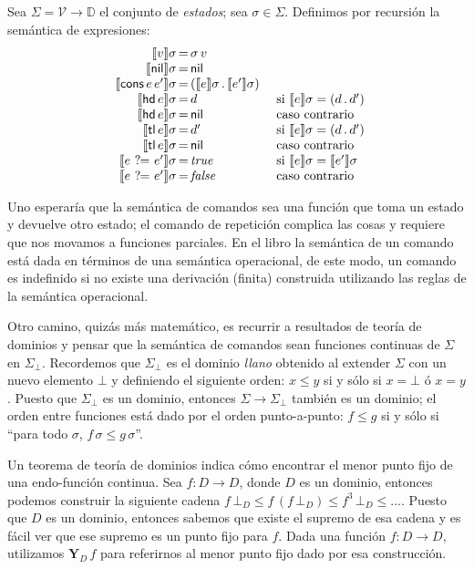 \documentclass[a4paper,twoside,12pt]{article}
\newcommand{\trees}{\mathbb{D}}
\newcommand{\nil}{\mathsf{nil}}
\newcommand{\cons}[2]{(#1\, .\, #2)}
\newcommand{\falseD}{\mathit{false}}
\newcommand{\trueD}{\mathit{true}}
\newcommand{\vars}{\mathcal{V}}
\newcommand{\hd}{\mathsf{hd}}
\newcommand{\tl}{\mathsf{tl}}
\newcommand{\conse}{\mathsf{cons}}
\newcommand{\isEq}{\mathop{?\!\!=}}
\newcommand{\sem}[2]{\llbracket #1 \rrbracket #2}
\newcommand{\fixpoint}[2]{\mathbf{Y}_{#1}\,#2}
\begin{document}
\begin{definition}[Semántica]
  Sea $\Sigma = \vars \to \trees$ el conjunto de \emph{estados}; sea
  $\sigma \in \Sigma$. Definimos por recursión la semántica de
  expresiones:
  \[
  \array{r@{\,=\,}l@{\quad}l@{}}%
  \sem{v}{\sigma} & \sigma\,v & {} \\
  \sem{\nil}{\sigma} & \nil & {} \\
  \sem{\conse\,e\,e'}{\sigma} & \cons{\sem e \sigma}{\sem{e'}{\sigma}} & {} \\
  \sem{\hd\,e}{\sigma} & d & \text{ si } \sem{e}{\sigma} = \cons{d}{d'} \\
  \sem{\hd\,e}{\sigma} & \nil & \text{ caso contrario }\\
  \sem{\tl\,e}{\sigma} & d' & \text{ si } \sem{e}{\sigma} = \cons{d}{d'} \\
  \sem{\tl\,e}{\sigma} & \nil & \text{ caso contrario }\\
  \sem{e\,\isEq\,e'}{\sigma} & \trueD & \text{ si } \sem{e}{\sigma} = \sem{e'}{\sigma} \\
  \sem{e\,\isEq\,e'}{\sigma} & \falseD & \text{ caso contrario } \\
  \endarray
  \]
\end{definition}

Uno esperaría que la semántica de comandos sea una función que toma un
estado y devuelve otro estado; el comando de repetición complica las
cosas y requiere que nos movamos a funciones parciales. En el libro la
semántica de un comando está dada en términos de una semántica
operacional, de este modo, un comando es indefinido si no existe una
derivación (finita) construida utilizando las reglas de la semántica
operacional.

Otro camino, quizás más matemático, es recurrir a resultados de teoría
de dominios y pensar que la semántica de comandos sean funciones
continuas de $\Sigma$ en $\Sigma_\bot$. Recordemos que $\Sigma_\bot$
es el dominio \emph{llano} obtenido al extender $\Sigma$ con un nuevo
elemento $\bot$ y definiendo el siguiente orden: $x \leqslant y$ si y
sólo si $x = \bot$ ó $x = y$. Puesto que $\Sigma_\bot$ es un dominio, entonces
$\Sigma\to \Sigma_\bot$ también es un dominio; el orden entre
funciones está dado por el orden punto-a-punto: $f \leqslant g $ si y
sólo si ``para todo $\sigma$, $f\,\sigma \leqslant g\,\sigma$''. 

Un teorema de teoría de dominios indica cómo encontrar el menor punto
fijo de una endo-función continua. Sea $f \colon D \to D$, donde $D$
es un dominio, entonces podemos construir la siguiente cadena 
$f\,\bot_D \leqslant f\,(f\,\bot_D) \leqslant f^3\,\bot_D\leqslant
\ldots$.
Puesto que $D$ es un dominio, entonces sabemos que existe el supremo
de esa cadena y es fácil ver que ese supremo es un punto fijo para
$f$. Dada una función $f \colon D \to D$, utilizamos $\fixpoint{D}{f}$
para referirnos al menor punto fijo dado por esa construcción.
\end{document}
